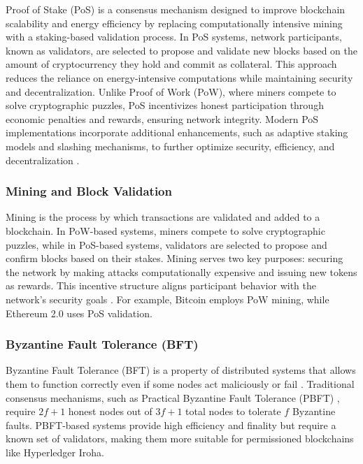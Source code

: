 \documentclass{article}
\begin{document}
Proof of Stake (PoS) is a consensus mechanism designed to improve blockchain scalability and energy efficiency by replacing computationally intensive mining with a staking-based validation process. In PoS systems, network participants, known as validators, are selected to propose and validate new blocks based on the amount of cryptocurrency they hold and commit as collateral. This approach reduces the reliance on energy-intensive computations while maintaining security and decentralization. Unlike Proof of Work (PoW), where miners compete to solve cryptographic puzzles, PoS incentivizes honest participation through economic penalties and rewards, ensuring network integrity. Modern PoS implementations incorporate additional enhancements, such as adaptive staking models and slashing mechanisms, to further optimize security, efficiency, and decentralization \cite{kiayias2017}.


\subsubsection{Mining and Block Validation}
Mining is the process by which transactions are validated and added to a blockchain. In PoW-based systems, miners compete to solve cryptographic puzzles, while in PoS-based systems, validators are selected to propose and confirm blocks based on their stakes. Mining serves two key purposes: securing the network by making attacks computationally expensive and issuing new tokens as rewards. This incentive structure aligns participant behavior with the network’s security goals \cite{bonneau2015sok}. For example, Bitcoin employs PoW mining, while Ethereum 2.0 uses PoS validation.

\subsubsection{Byzantine Fault Tolerance (BFT)}

Byzantine Fault Tolerance (BFT) is a property of distributed systems that allows them to function correctly even if some nodes act maliciously or fail \cite{lamport1982byzantine}. Traditional consensus mechanisms, such as Practical Byzantine Fault Tolerance (PBFT) \cite{castro1999practical}, require \(2f+1\) honest nodes out of \(3f+1\) total nodes to tolerate \(f\) Byzantine faults. PBFT-based systems provide high efficiency and finality but require a known set of validators, making them more suitable for permissioned blockchains like Hyperledger Iroha.
\end{document}
